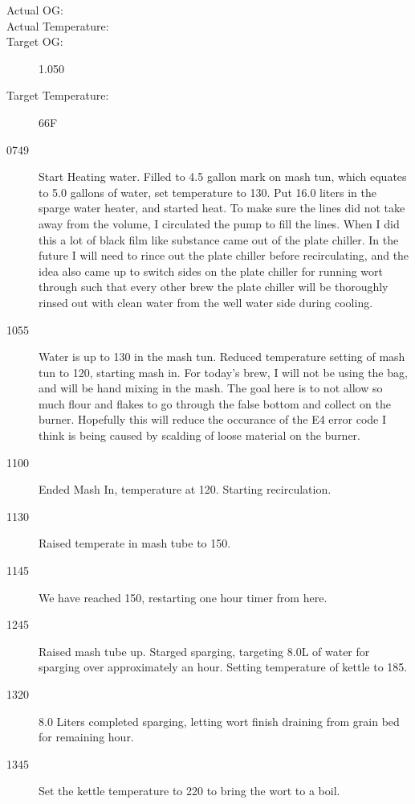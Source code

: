 \begin{description}
    \item[Actual OG:]
    \item[Actual Temperature:]

    \item[Target OG:] 1.050
    \item[Target Temperature:] 66F
\end{description}

\def\todaysdate{20191229}
\newday{\todaysdate}\label{\todaysdate}

\FloatBarrier{}
\begin{description}
    \item[0749] Start Heating water.  Filled to 4.5 gallon mark on mash tun, which equates to 5.0 gallons of water, set temperature to 130.  Put 16.0 liters in the sparge water heater, and started heat.  To make sure the lines did not take away from the volume, I circulated the pump to fill the lines.  When I did this a lot of black film like substance came out of the plate chiller.  In the future I will need to rince out the plate chiller before recirculating, and the idea also came up to switch sides on the plate chiller for running wort through such that every other brew the plate chiller will be thoroughly rinsed out with clean water from the well water side during cooling.
    \item[1055] Water is up to 130 in the mash tun. Reduced temperature setting of mash tun to 120, starting mash in.  For today's brew, I will not be using the bag, and will be hand mixing in the mash.  The goal here is to not allow so much flour and flakes to go through the false bottom and collect on the burner.  Hopefully this will reduce the occurance of the E4 error code I think is being caused by scalding of loose material on the burner.
    \item[1100] Ended Mash In, temperature at 120.  Starting recirculation.
    \item[1130] Raised temperate in mash tube to 150.  
    \item[1145] We have reached 150, restarting one hour timer from here.
    \item[1245] Raised mash tube up. Starged sparging, targeting 8.0L of water for sparging over approximately an hour.  Setting temperature of kettle to 185.
    \item[1320] 8.0 Liters completed sparging, letting wort finish draining from grain bed for remaining hour.
    \item[1345] Set the kettle temperature to 220 to bring the wort to a boil.

\end{description}
